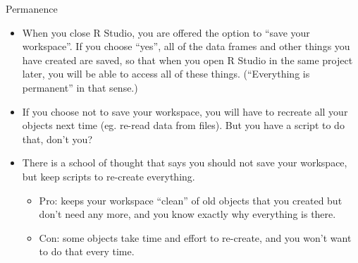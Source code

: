 \documentclass[ignorenonframetext,]{beamer}
\providecommand{\tightlist}{%
  \setlength{\itemsep}{0pt}\setlength{\parskip}{0pt}}
\begin{document}
\begin{frame}{Permanence}
\protect\hypertarget{permanence}{}

\begin{itemize}
\tightlist
\item
  When you close R Studio, you are offered the option to ``save your
  workspace''. If you choose ``yes'', all of the data frames and other
  things you have created are saved, so that when you open R Studio in
  the same project later, you will be able to access all of these
  things. (``Everything is permanent'' in that sense.)
\item
  If you choose not to save your workspace, you will have to recreate
  all your objects next time (eg. re-read data from files). But you have
  a script to do that, don't you?
\item
  There is a school of thought that says you should not save your
  workspace, but keep scripts to re-create everything.

  \begin{itemize}
  \tightlist
  \item
    Pro: keeps your workspace ``clean'' of old objects that you created
    but don't need any more, and you know exactly why everything is
    there.
  \item
    Con: some objects take time and effort to re-create, and you won't
    want to do that every time.
  \end{itemize}
\end{itemize}

\end{frame}
\end{document}
